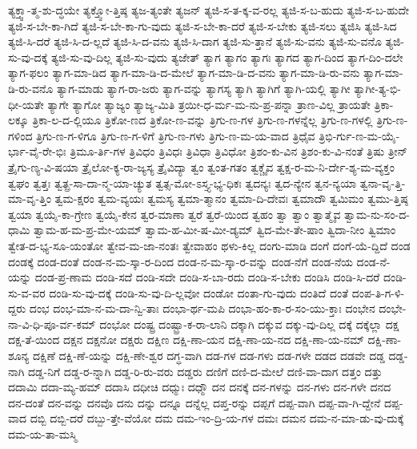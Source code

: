 {ತ್ಯಕ್ತ್ವಾ-ತ್ಮ-ಶು-ದ್ಧಯೇ
ತ್ಯಕ್ತ್ವೋ-ತ್ತಿಷ್ಠ
ತ್ಯಜ-ತ್ಯಂತೇ
ತ್ಯಜನ್
ತ್ಯಜಿ-ಸ-ತ-ಕ್ಕ-ವ-ರಲ್ಲ
ತ್ಯಜಿ-ಸ-ಬ-ಹುದು
ತ್ಯಜಿ-ಸ-ಬ-ಹುದೇ
ತ್ಯಜಿ-ಸ-ಬೇ-ಕಾ-ಗಿದೆ
ತ್ಯಜಿ-ಸ-ಬೇ-ಕಾ-ಗು-ವುದು
ತ್ಯಜಿ-ಸ-ಬೇ-ಕಾ-ದರೆ
ತ್ಯಜಿ-ಸ-ಬೇಕು
ತ್ಯಜಿ-ಸಲು
ತ್ಯಜಿಸಿ
ತ್ಯಜಿ-ಸಿದ
ತ್ಯಜಿ-ಸಿ-ದರೆ
ತ್ಯಜಿ-ಸಿ-ದ-ಲ್ಲದೆ
ತ್ಯಜಿ-ಸಿ-ದ-ವನು
ತ್ಯಜಿ-ಸಿ-ದಾಗ
ತ್ಯಜಿ-ಸು-ತ್ತಾನೆ
ತ್ಯಜಿ-ಸು-ವನು
ತ್ಯಜಿ-ಸು-ವನೊ
ತ್ಯಜಿ-ಸು-ವು-ದಕ್ಕೆ
ತ್ಯಜಿ-ಸು-ವು-ದಿಲ್ಲ
ತ್ಯಜಿ-ಸು-ವುದು
ತ್ಯಜೇತ್
ತ್ಯಾಗ
ತ್ಯಾಗಂ
ತ್ಯಾಗಃ
ತ್ಯಾಗದ
ತ್ಯಾಗ-ದಿಂದ
ತ್ಯಾಗ-ದಿಂ-ದಲೇ
ತ್ಯಾಗ-ಫಲಂ
ತ್ಯಾಗ-ಮಾ-ಡಿದ
ತ್ಯಾಗ-ಮಾ-ಡಿ-ದ-ಮೇಲೆ
ತ್ಯಾಗ-ಮಾ-ಡಿ-ದ-ವನು
ತ್ಯಾಗ-ಮಾ-ಡಿ-ರು-ವನು
ತ್ಯಾಗ-ಮಾ-ಡಿ-ರು-ವನೊ
ತ್ಯಾಗ-ಮಾಡು
ತ್ಯಾಗ-ರಾ-ಜರು
ತ್ಯಾಗ-ವನ್ನು
ತ್ಯಾಗಸ್ಯ
ತ್ಯಾಗಿ
ತ್ಯಾಗಿಗೆ
ತ್ಯಾಗಿ-ಯಲ್ಲಿ
ತ್ಯಾಗೀ
ತ್ಯಾಗೀ-ತ್ಯ-ಭಿ-ಧೀ-ಯತೇ
ತ್ಯಾಗೇ
ತ್ಯಾಗೋ
ತ್ಯಾಜ್ಯಂ
ತ್ಯಾಜ್ಯ-ಮಿತಿ
ತ್ರಯೀ-ಧ-ರ್ಮ-ಮ-ನು-ಪ್ರ-ಪನ್ನಾ
ತ್ರಾಣ-ವಿಲ್ಲ
ತ್ರಾಯತೇ
ತ್ರಿಕಾ-ಲಕ್ಕೂ
ತ್ರಿಕಾ-ಲ-ದ-ಲ್ಲಿಯೂ
ತ್ರಿಕೋ-ಣದ
ತ್ರಿಕೋ-ಣ-ವನ್ನು
ತ್ರಿಗು-ಣ-ಗಳ
ತ್ರಿಗು-ಣ-ಗಳನ್ನೆಲ್ಲ
ತ್ರಿಗು-ಣ-ಗಳಲ್ಲಿ
ತ್ರಿಗು-ಣ-ಗಳಿಂದ
ತ್ರಿಗು-ಣ-ಗ-ಳಿಗೂ
ತ್ರಿಗು-ಣ-ಗ-ಳಿಗೆ
ತ್ರಿಗು-ಣ-ಗಳು
ತ್ರಿಗು-ಣ-ಮ-ಯ-ವಾದ
ತ್ರಿಧೈವ
ತ್ರಿಭಿ-ರ್ಗು-ಣ-ಮ-ಯೈ-ರ್ಭಾ-ವೈ-ರೇ-ಭಿಃ
ತ್ರಿಮೂ-ರ್ತಿ-ಗಳ
ತ್ರಿವಿಧಂ
ತ್ರಿವಿಧಃ
ತ್ರಿವಿಧಾ
ತ್ರಿವಿಧೋ
ತ್ರಿಶಂ-ಕು-ವಿನ
ತ್ರಿಶಂ-ಕು-ವಿ-ನಂತೆ
ತ್ರಿಷು
ತ್ರೀನ್
ತ್ರೈಗು-ಣ್ಯ-ವಿ-ಷಯಾ
ತ್ರೈಲೋ-ಕ್ಯ-ರಾ-ಜ್ಯಸ್ಯ
ತ್ರೈವಿದ್ಯಾ
ತ್ವಂ
ತ್ವಂತ-ಗತಂ
ತ್ವಕ್ಚೈವ
ತ್ವಕ್ಷ-ರ-ಮ-ನಿ-ರ್ದೇ-ಶ್ಯ-ಮ-ವ್ಯಕ್ತಂ
ತ್ವಘಂ
ತ್ವತ್ತಃ
ತ್ವತ್ಪ್ರ-ಸಾ-ದಾ-ನ್ಮ-ಯಾ-ಚ್ಯುತ
ತ್ವತ್ಸ-ಮೋ-ಽಸ್ತ್ಯ-ಭ್ಯ-ಧಿಕಃ
ತ್ವದನ್ಯಃ
ತ್ವದ-ನ್ಯೇನ
ತ್ವನ-ನ್ಯಯಾ
ತ್ವನಾ-ವೃ-ತ್ತಿ-ಮಾ-ವೃ-ತ್ತಿಂ
ತ್ವಮ-ಕ್ಷರಂ
ತ್ವಮ-ವ್ಯಯಃ
ತ್ವಮಸ್ಯ
ತ್ವಮಾ-ತ್ಮಾನಂ
ತ್ವಮಾ-ದಿ-ದೇವಃ
ತ್ವಮಾದೌ
ತ್ವಮಿಮಂ
ತ್ವಮು-ತ್ತಿಷ್ಠ
ತ್ವಯಾ
ತ್ವಯೈ-ಕಾ-ಗ್ರೇಣ
ತ್ವಯೈ-ಕೇನ
ತ್ವರ-ಮಾಣಾ
ತ್ವರೆ
ತ್ವರೆ-ಯಿಂದ
ತ್ವಹಂ
ತ್ವಾ
ತ್ವಾಂ
ತ್ವಾತ್ಮೈವ
ತ್ವಾಮ-ನು-ಸಂ-ದ-ಧಾಮಿ
ತ್ವಾಮ-ಹ-ಮ-ಪ್ರ-ಮೇ-ಯಮ್
ತ್ವಾಮ-ಹ-ಮೀ-ಷ-ಮೀ-ಡ್ಯಮ್
ತ್ವಿದ-ಮೇ-ತೇ-ಷಾಂ
ತ್ವಿದಾ-ನೀಂ
ತ್ವಿಮಾಂ
ತ್ವೇತ-ದ-ಭ್ಯ-ಸೂ-ಯಂತೋ
ತ್ವೇವ-ಮ-ಜಾ-ನಂತಃ
ತ್ವೇವಾಹಂ
ಥಳು-ಕಿಲ್ಲ
ದಂಗು-ಮಾಡಿ
ದಂಗೆ
ದಂಗೆ-ಯೆ-ದ್ದಿದೆ
ದಂಡ
ದಂಡಕ್ಕೆ
ದಂಡ-ದಂತೆ
ದಂಡ-ನ-ಮ-ಸ್ಕಾ-ರ-ದಿಂದ
ದಂಡ-ನ-ಮ-ಸ್ಕಾ-ರ-ವನ್ನು
ದಂಡ-ನೆಗೆ
ದಂಡ-ನೆಯ
ದಂಡ-ನೆ-ಯನ್ನು
ದಂಡ-ಪ್ರ-ಣಾಮ
ದಂಡಿ-ಸದೆ
ದಂಡಿ-ಸದೇ
ದಂಡಿ-ಸ-ಬಾ-ರದು
ದಂಡಿ-ಸ-ಬೇಕು
ದಂಡಿಸಿ
ದಂಡಿ-ಸಿ-ದರೆ
ದಂಡಿ-ಸು-ವ-ವರ
ದಂಡಿ-ಸು-ವು-ದಕ್ಕೆ
ದಂಡಿ-ಸು-ವು-ದಿ-ಲ್ಲವೋ
ದಂಡೋ
ದಂತಾ-ಗು-ವುದು
ದಂತಿದೆ
ದಂತೆ
ದಂಪ-ತಿ-ಗ-ಳಿ-ದ್ದರು
ದಂಭ
ದಂಭ-ಮಾ-ನ-ಮ-ದಾ-ನ್ವಿ-ತಾಃ
ದಂಭಾ-ರ್ಥ-ಮಪಿ
ದಂಭಾ-ಹಂ-ಕಾ-ರ-ಸಂ-ಯು-ಕ್ತಾಃ
ದಂಭೇನ
ದಂಭೇ-ನಾ-ವಿ-ಧಿ-ಪೂ-ರ್ವ-ಕಮ್
ದಂಭೋ
ದಂಷ್ಟ್ರ
ದಂಷ್ಟ್ರಾ-ಕ-ರಾ-ಲಾನಿ
ದಕ್ಕಾಗಿ
ದಕ್ಕುವ
ದಕ್ಕು-ವು-ದಿಲ್ಲ
ದಕ್ಕೆ
ದಕ್ಕೆಲ್ಲಾ
ದಕ್ಷ
ದಕ್ಷ-ತೆ-ಯಿಂದ
ದಕ್ಷನ
ದಕ್ಷನೋ
ದಕ್ಷರು
ದಕ್ಷಿಣ
ದಕ್ಷಿ-ಣಾ-ಯನ
ದಕ್ಷಿ-ಣಾ-ಯ-ನದ
ದಕ್ಷಿ-ಣಾ-ಯ-ನಮ್
ದಕ್ಷಿ-ಣಾ-ಶೂನ್ಯ
ದಕ್ಷಿಣೆ
ದಕ್ಷಿ-ಣೆ-ಯನ್ನು
ದಕ್ಷಿ-ಣೇ-ಶ್ವರ
ದಗ್ಧ-ವಾಗಿ
ದಡ-ಗಳ
ದಡ-ಗಳು
ದಡ-ಗಳೇ
ದಡದ
ದಡವೇ
ದಡ್ಡ
ದಡ್ಡ-ನಾಗಿ
ದಡ್ಡ-ನಿಗೆ
ದಡ್ಡ-ರ-ನ್ನಾಗಿ
ದಡ್ಡ-ರಿ-ರು-ವರು
ದಡ್ಡರು
ದಣಿಗೆ
ದಣಿ-ದ-ಮೇಲೆ
ದಣಿ-ವಾ-ದಾಗ
ದತ್ತಂ
ದತ್ತು
ದದಾಮಿ
ದದಾ-ಮ್ಯ-ಹಮ್
ದದಾಸಿ
ದಧೀಚಿ
ದಧ್ಮುಃ
ದಧ್ಮೌ
ದನ
ದನಕ್ಕೆ
ದನ-ಗಳನ್ನು
ದನ-ಗಳು
ದನ-ಗಳೇ
ದನದ
ದನ-ದಂತೆ
ದನ-ವನ್ನು
ದನವೊ
ದನು
ದನ್ನು
ದನ್ನೂ
ದನ್ನೆಲ್ಲ
ದಪ್ತ-ರನ್ನು
ದಪ್ಪಗೆ
ದಪ್ಪ-ವಾಗಿ
ದಪ್ಪ-ವಾ-ಗಿ-ದ್ದೇನೆ
ದಪ್ಪ-ವಾದ
ದಬ್ಬಿ
ದಬ್ಬಿ-ದರೆ
ದಬ್ಬು-ತ್ತೇ-ವೆಯೋ
ದಮ
ದಮ-ಇಂ-ದ್ರಿ-ಯ-ಗಳ
ದಮಃ
ದಮನ
ದಮ-ನ-ಮಾ-ಡು-ವು-ದುಕ್ಕೆ
ದಮ-ಯ-ತಾ-ಮಸ್ಮಿ
}
